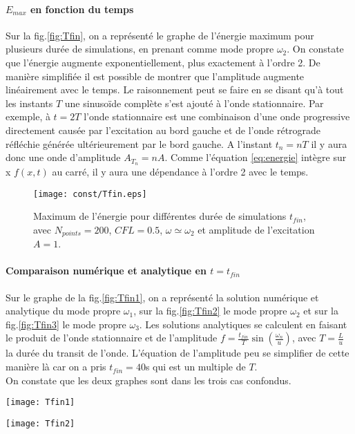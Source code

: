\documentclass[a4paper,12pt,oneside]{article}
\begin{document}
\paragraph{$E_{max}$ en fonction du temps}
Sur la fig.\eqref{fig:Tfin}, on a représenté le graphe de l'énergie maximum pour plusieurs durée de simulations, en prenant comme mode propre $\omega_2$. On constate que l'énergie augmente exponentiellement, plus exactement à l'ordre 2. 
 De manière simplifiée il est possible de montrer que l'amplitude augmente linéairement avec le temps. Le raisonnement peut se faire en se disant qu'à tout les instants $T$ une sinusoïde complète s'est ajouté à l'onde stationnaire. Par exemple, à $t=2T$ l'onde stationnaire est une combinaison d'une onde progressive directement causée par l'excitation au bord gauche et de l'onde rétrograde réfléchie générée ultérieurement par le bord gauche. A l'instant $t_n=nT$ il y aura donc une onde d'amplitude $A_{T_n}=nA$. Comme l'équation \eqref{eq:energie} intègre sur x $f(x,t)$ au carré, il y aura une dépendance à l'ordre 2 avec le temps.
\begin{figure}[H]
    \centering
    \texttt{[image: const/Tfin.eps]}
    \caption{Maximum de l'énergie pour différentes durée de simulations $t_{fin}$, avec $N_{points}=200$, $CFL=0.5$,  $\omega\simeq \omega_2$ et amplitude de l'excitation $A=1$.}
    \label{fig:Tfin}
\end{figure}

\paragraph{Comparaison numérique et analytique en $t=t_{fin}$}
Sur le graphe de la fig.\eqref{fig:Tfin1}, on a représenté la solution numérique et analytique du mode propre $\omega_1$, sur la fig.\eqref{fig:Tfin2} le mode propre $\omega_2$ et sur la fig.\eqref{fig:Tfin3} le mode propre $\omega_3$.  Les solutions analytiques se calculent en faisant le produit de l'onde stationnaire et de l'amplitude $f=\frac{t_{fin}}{T}\sin(\frac{\omega_n}{u})$, avec $T=\frac{L}{u}$ la durée du transit de l'onde. L'équation de l'amplitude peu se simplifier de cette manière là car on a pris $t_{fin}=40$s qui est un multiple de $T$.\\
On constate que les deux graphes sont dans les trois cas confondus.

\begin{minipage}[t]{0.45\linewidth}
\hspace{-1.8cm}
\texttt{[image: Tfin1]}
\label{fig:Tfin1}
\end{minipage}
\hspace{1cm}
\begin{minipage}[t]{0.45\linewidth}
\hspace{-1cm}
\texttt{[image: Tfin2]}
\label{fig:Tfin2}
\end{minipage}
\end{document}
